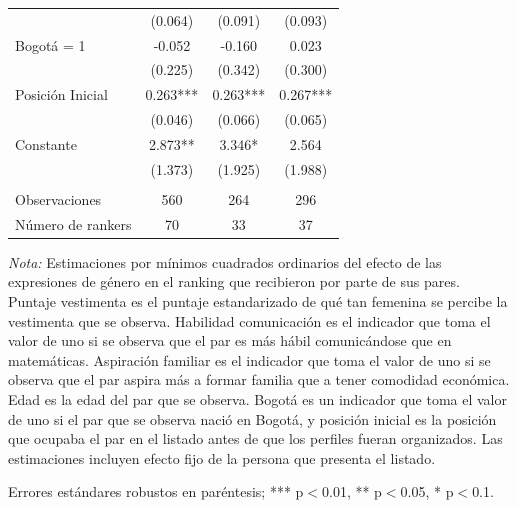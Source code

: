 \begin{table}[ht!]
\begin{threeparttable}
{\begin{tabular}{lccc}
                                                &   (0.064)	&   (0.091)	&   (0.093) \\
    Bogotá = 1                                  &   -0.052	&   -0.160	&   0.023   \\
                                                &   (0.225)	&   (0.342)	&   (0.300) \\
    Posición Inicial                            &  0.263***	&  0.263***	&  0.267*** \\
                                                &   (0.046)	&   (0.066)	&   (0.065) \\
    Constante                                   &   2.873**	&   3.346*	&   2.564   \\
                                                &   (1.373)	&   (1.925)	&   (1.988) \\
                                                &           &           &           \\
    Observaciones                               &   560     &   264     &   296     \\
    Número de rankers                           &   70      &   33      &   37      \\ \hline \hline
    \end{tabular}}
    \begin{tablenotes}
    \footnotesize{
    \item \textit{Nota:} Estimaciones por mínimos cuadrados ordinarios del efecto de las expresiones de género en el ranking que recibieron por parte de sus pares. Puntaje vestimenta es el puntaje estandarizado de qué tan femenina se percibe la vestimenta que se observa. Habilidad comunicación es el indicador que toma el valor de uno si se observa que el par es más hábil comunicándose que en matemáticas. Aspiración familiar es el indicador que toma el valor de uno si se observa que el par aspira más a formar familia que a tener comodidad económica. Edad es la edad del par que se observa. Bogotá es un indicador que toma el valor de uno si el par que se observa nació en Bogotá, y posición inicial es la posición que ocupaba el par en el listado antes de que los perfiles fueran organizados. Las estimaciones incluyen efecto fijo de la persona que presenta el listado. 
    \item Errores estándares robustos en paréntesis; *** p$<$0.01, ** p$<$0.05, * p$<$0.1.}
    \end{tablenotes}
    \end{threeparttable}
\end{table}

